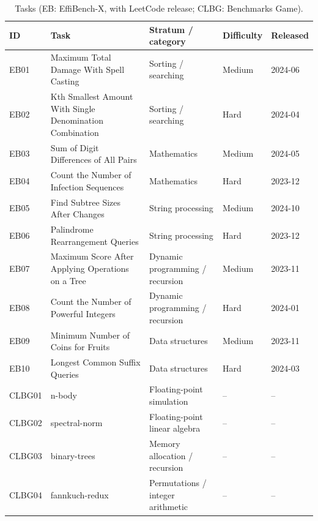 \begin{table}[t]
  \centering
  \caption{Tasks (EB: EffiBench-X, with LeetCode release; CLBG: Benchmarks Game).}
  \label{tab:tasks}
  \footnotesize
  \begin{tabular}{@{}lllll@{}}
    \toprule
    ID & Task & Stratum / category & Difficulty & Released \\
    \midrule
    EB01 & Maximum Total Damage With Spell Casting                   & Sorting / searching          & Medium & 2024-06 \\
    EB02 & Kth Smallest Amount With Single Denomination Combination  & Sorting / searching          & Hard   & 2024-04 \\
    EB03 & Sum of Digit Differences of All Pairs                     & Mathematics                  & Medium & 2024-05 \\
    EB04 & Count the Number of Infection Sequences                   & Mathematics                  & Hard   & 2023-12 \\
    EB05 & Find Subtree Sizes After Changes                          & String processing            & Medium & 2024-10 \\
    EB06 & Palindrome Rearrangement Queries                          & String processing            & Hard   & 2023-12 \\
    EB07 & Maximum Score After Applying Operations on a Tree         & Dynamic programming / recursion & Medium & 2023-11 \\
    EB08 & Count the Number of Powerful Integers                     & Dynamic programming / recursion & Hard   & 2024-01 \\
    EB09 & Minimum Number of Coins for Fruits                        & Data structures              & Medium & 2023-11 \\
    EB10 & Longest Common Suffix Queries                             & Data structures              & Hard   & 2024-03 \\
    \midrule
    CLBG01 & n-body          & Floating-point simulation        & -- & -- \\
    CLBG02 & spectral-norm   & Floating-point linear algebra    & -- & -- \\
    CLBG03 & binary-trees    & Memory allocation / recursion    & -- & -- \\
    CLBG04 & fannkuch-redux  & Permutations / integer arithmetic & -- & -- \\
    \bottomrule
  \end{tabular}
\end{table}

